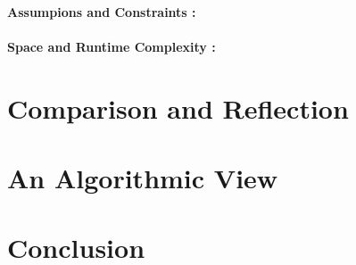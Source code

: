 \documentclass[twocolumn,a4paper]{article}
\begin{document}
\paragraph{Assumpions and Constraints :}

\paragraph{Space and Runtime Complexity :}

\section{Comparison and Reflection}

\section{An Algorithmic View}

\section{Conclusion}



\end{document}
